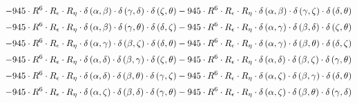 \begin{subequations}
\begin{gather}
 \\[0.2em] \notag 		 - 945 \cdot R^{6} \cdot R_{\epsilon{}} \cdot R_{\eta{}} \cdot \delta{}\left(\alpha{}, \beta{}\right) \cdot \delta{}\left(\gamma{}, \delta{}\right) \cdot \delta{}\left(\zeta{}, \theta{}\right)- 945 \cdot R^{6} \cdot R_{\epsilon{}} \cdot R_{\eta{}} \cdot \delta{}\left(\alpha{}, \beta{}\right) \cdot \delta{}\left(\gamma{}, \zeta{}\right) \cdot \delta{}\left(\delta{}, \theta{}\right) 
 \\[0.2em] \notag 		 - 945 \cdot R^{6} \cdot R_{\epsilon{}} \cdot R_{\eta{}} \cdot \delta{}\left(\alpha{}, \beta{}\right) \cdot \delta{}\left(\gamma{}, \theta{}\right) \cdot \delta{}\left(\delta{}, \zeta{}\right)- 945 \cdot R^{6} \cdot R_{\epsilon{}} \cdot R_{\eta{}} \cdot \delta{}\left(\alpha{}, \gamma{}\right) \cdot \delta{}\left(\beta{}, \delta{}\right) \cdot \delta{}\left(\zeta{}, \theta{}\right) 
 \\[0.2em] \notag 		 - 945 \cdot R^{6} \cdot R_{\epsilon{}} \cdot R_{\eta{}} \cdot \delta{}\left(\alpha{}, \gamma{}\right) \cdot \delta{}\left(\beta{}, \zeta{}\right) \cdot \delta{}\left(\delta{}, \theta{}\right)- 945 \cdot R^{6} \cdot R_{\epsilon{}} \cdot R_{\eta{}} \cdot \delta{}\left(\alpha{}, \gamma{}\right) \cdot \delta{}\left(\beta{}, \theta{}\right) \cdot \delta{}\left(\delta{}, \zeta{}\right) 
 \\[0.2em] \notag 		 - 945 \cdot R^{6} \cdot R_{\epsilon{}} \cdot R_{\eta{}} \cdot \delta{}\left(\alpha{}, \delta{}\right) \cdot \delta{}\left(\beta{}, \gamma{}\right) \cdot \delta{}\left(\zeta{}, \theta{}\right)- 945 \cdot R^{6} \cdot R_{\epsilon{}} \cdot R_{\eta{}} \cdot \delta{}\left(\alpha{}, \delta{}\right) \cdot \delta{}\left(\beta{}, \zeta{}\right) \cdot \delta{}\left(\gamma{}, \theta{}\right) 
 \\[0.2em] \notag 		 - 945 \cdot R^{6} \cdot R_{\epsilon{}} \cdot R_{\eta{}} \cdot \delta{}\left(\alpha{}, \delta{}\right) \cdot \delta{}\left(\beta{}, \theta{}\right) \cdot \delta{}\left(\gamma{}, \zeta{}\right)- 945 \cdot R^{6} \cdot R_{\epsilon{}} \cdot R_{\eta{}} \cdot \delta{}\left(\alpha{}, \zeta{}\right) \cdot \delta{}\left(\beta{}, \gamma{}\right) \cdot \delta{}\left(\delta{}, \theta{}\right) 
 \\[0.2em] \notag 		 - 945 \cdot R^{6} \cdot R_{\epsilon{}} \cdot R_{\eta{}} \cdot \delta{}\left(\alpha{}, \zeta{}\right) \cdot \delta{}\left(\beta{}, \delta{}\right) \cdot \delta{}\left(\gamma{}, \theta{}\right)- 945 \cdot R^{6} \cdot R_{\epsilon{}} \cdot R_{\eta{}} \cdot \delta{}\left(\alpha{}, \zeta{}\right) \cdot \delta{}\left(\beta{}, \theta{}\right) \cdot \delta{}\left(\gamma{}, \delta{}\right) 

\end{gather}
\end{subequations}
